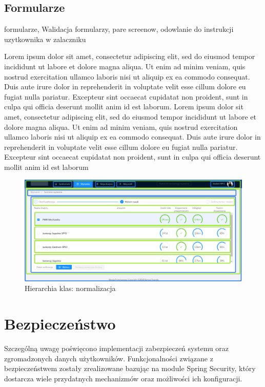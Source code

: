 \subsection{Formularze}

formularze, Walidacja formularzy, pare screenow, odowlanie do instrukcji uzytkownika w zalaczniku

Lorem ipsum dolor sit amet, consectetur adipiscing elit, sed do eiusmod tempor incididunt ut labore et dolore magna aliqua. Ut enim ad minim veniam, quis nostrud exercitation ullamco laboris nisi ut aliquip ex ea commodo consequat. Duis aute irure dolor in reprehenderit in voluptate velit esse cillum dolore eu fugiat nulla pariatur. Excepteur sint occaecat cupidatat non proident, sunt in culpa qui officia deserunt mollit anim id est laborum. Lorem ipsum dolor sit amet, consectetur adipiscing elit, sed do eiusmod tempor incididunt ut labore et dolore magna aliqua. Ut enim ad minim veniam, quis nostrud exercitation ullamco laboris nisi ut aliquip ex ea commodo consequat. Duis aute irure dolor in reprehenderit in voluptate velit esse cillum dolore eu fugiat nulla pariatur. Excepteur sint occaecat cupidatat non proident, sunt in culpa qui officia deserunt mollit anim id est laborum

\begin{figure}[H]
\centering
\includegraphics[width=0.7\linewidth]{06-implementacja/rys/modularyzacja.PNG}
\caption{Hierarchia klas: normalizacja}
\label{fig:criterion-classes}
\end{figure}

\section{Bezpieczeństwo}

Szczególną uwagę poświęcono implementacji zabezpieczeń systemu oraz zgromadzonych danych użytkowników. Funkcjonalności związane z bezpieczeństwem zostały zrealizowane bazując na module Spring Security, który dostarcza wiele przydatnych mechanizmów oraz możliwości ich konfiguracji.

